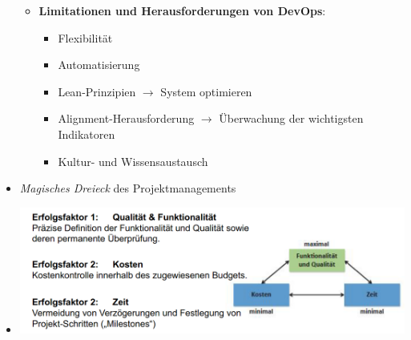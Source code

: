 \documentclass[12pt,a4paper]{article}
\begin{document}
\begin{itemize}
\begin{itemize}
			\item \textbf{Limitationen und Herausforderungen von DevOps}:
			   \begin{itemize}
					\item Flexibilität
					\item Automatisierung
					\item Lean-Prinzipien $\rightarrow$ System optimieren
					\item Alignment-Herausforderung $\rightarrow$ Überwachung der wichtigsten Indikatoren
					\item Kultur- und Wissensaustausch
            \end{itemize}
      \end{itemize}
   
   \item \emph{Magisches Dreieck} des Projektmanagements
   \item[] \includegraphics[scale=0.5]{magic.png}
\end{itemize}


\vspace{0.5cm}
\end{document}
